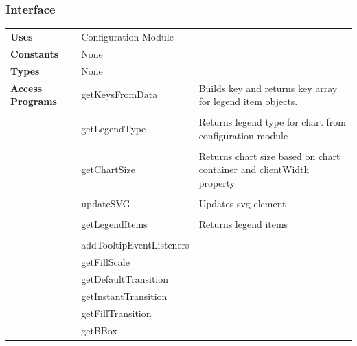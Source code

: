 \documentclass[12pt, titlepage]{article}
\begin{document}
\subsubsection{Interface}
\begin{table}[H]
\begin{tabular}{llp{6cm}}
\textbf{Uses}            & Configuration Module     &                                                                      \\
\textbf{Constants}       & None                     &                                                                      \\
\textbf{Types}           & None                     &                                                                      \\
\textbf{Access Programs} & getKeysFromData         & Builds key and returns key array for legend item objects.\\            \\
                         & getLegendType            & Returns legend type for chart from configuration module              \\\\
                         & getChartSize             & Returns chart size based on chart container and clientWidth property \\ \\
                         & updateSVG                & Updates svg element \\                                                                     \\
                         & getLegendItems           & Returns legend items \\                                                                     \\
                         & addTooltipEventListeners &                                                                      \\
                         & getFillScale             &                                                                      \\
                         & getDefaultTransition     &                                                                      \\
                         & getInstantTransition     &                                                                      \\
                         & getFillTransition        &                                                                      \\
                         & getBBox                  &                                                                     
\end{tabular}
\end{table}
\end{document}
